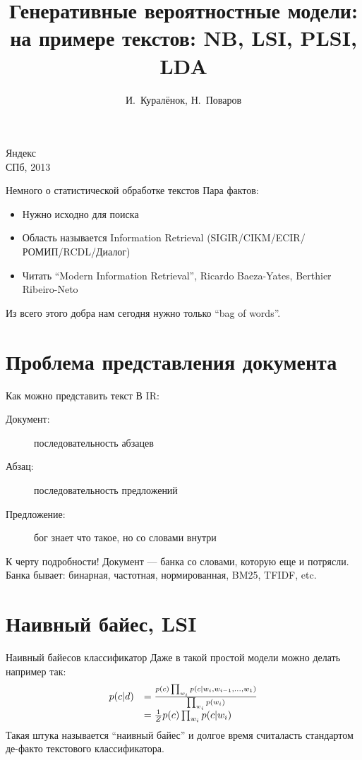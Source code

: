 \documentclass[14pt, fleqn, xcolor={dvipsnames, table}]{beamer}
\title{Генеративные вероятностные модели:\\\small{на примере текстов: NB, LSI, PLSI, LDA}}
\author[]{\small{%
И.~Куралёнок,
Н.~Поваров}}
\date{}
\begin{document}
\begin{frame}

\maketitle
\small
\begin{center}
\vspace{-60pt}
\normalsize {\color{red}Я}ндекс \\
\vspace{80pt}
\footnotesize СПб, 2013
\end{center}
\end{frame}

\begin{frame}{Немного о статистической обработке текстов}
Пара фактов:
\begin{itemize}
  \item Нужно исходно для поиска
  \item Область называется Information Retrieval (SIGIR/CIKM/ECIR/РОМИП/RCDL/Диалог)
  \item Читать ``Modern Information Retrieval'', Ricardo Baeza-Yates, Berthier Ribeiro-Neto
\end{itemize}
Из всего этого добра нам сегодня нужно только ``bag of words''.
\end{frame}

\section{Проблема представления документа}
\begin{frame}{Как можно представить текст}
В IR:
\begin{description}
  \item[Документ:] последовательность абзацев
  \item[Абзац:] последовательность предложений
  \item[Предложение:] бог знает что такое, но со словами внутри
\end{description}
К черту подробности! Документ --- банка со словами, которую еще и потрясли.\\ Банка бывает: бинарная, частотная, нормированная, BM25, TFIDF, etc.
\end{frame}

\section{Наивный байес, LSI}

\begin{frame}{Наивный байесов классификатор}
Даже в такой простой модели можно делать например так:
$$\begin{array}{ll}
p(c|d) &= {p(c)\prod_{w_i} p(c|w_i, w_{i-1}, \ldots, w_1) \over \prod_{w_i} p(w_i)} \\
& = \frac{1}{Z} p(c) \prod_{w_i} p(c|w_i)
\end{array}$$
Такая штука называется ``наивный байес'' и долгое время считаласть стандартом де-факто текстового классификатора.
\end{frame}
\end{document}
